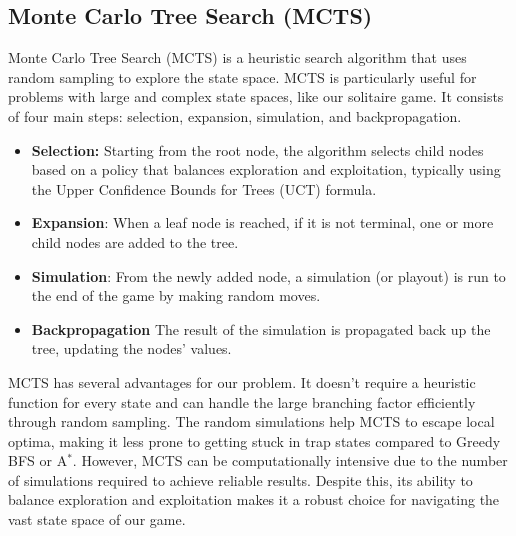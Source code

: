 \subsection{Monte Carlo Tree Search (MCTS)}
Monte Carlo Tree Search (MCTS) is a heuristic search algorithm that uses random sampling to explore the state space. MCTS is particularly useful for problems with large and complex state spaces, like our solitaire game. It consists of four main steps: selection, expansion, simulation, and backpropagation.
\begin{itemize}
    \item \textbf{Selection:} Starting from the root node, the algorithm selects child nodes based on a policy that balances exploration and exploitation, typically using the Upper Confidence Bounds for Trees (UCT) formula.
    \item \textbf{Expansion}: When a leaf node is reached, if it is not terminal, one or more child nodes are added to the tree.
    \item \textbf{Simulation}: From the newly added node, a simulation (or playout) is run to the end of the game by making random moves.
    \item \textbf{Backpropagation} The result of the simulation is propagated back up the tree, updating the nodes' values.
\end{itemize}

MCTS has several advantages for our problem. It doesn't require a heuristic function for every state and can handle the large branching factor efficiently through random sampling. The random simulations help MCTS to escape local optima, making it less prone to getting stuck in trap states compared to Greedy BFS or A$^*$. However, MCTS can be computationally intensive due to the number of simulations required to achieve reliable results. Despite this, its ability to balance exploration and exploitation makes it a robust choice for navigating the vast state space of our game.
